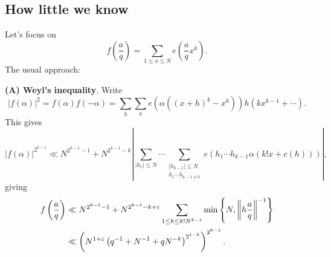 \documentclass[reqno]{amsart} 
\numberwithin{theorem}{section}
\numberwithin{equation}{section}
\begin{document}
\subsection{How little we know}

Let's focus on
\begin{equation*}
  f\left(\frac{a}{q}\right) = \sum_{1 \leq x \leq N}
  e \left( \frac{a}{q} x^k \right).
\end{equation*}
The usual approach:

\textbf{(A) Weyl's inequality}.  Write
\begin{equation*}
  \lvert f(\alpha) \rvert^2 = f(\alpha) f(- \alpha)
  = \sum_h \sum_x e \left( \alpha \left((x + h)^k - x^k \right) \right)
  h(k x^{k - 1} + \dotsb).
\end{equation*}
This gives
\begin{equation*}
  \lvert f(\alpha) \rvert^{2^{k - 1}}
  \ll N^{2^{k - 1} - 1} + N^{2^{k - 1} - k}
  \left\lvert
    \sum_{\lvert h_1 \rvert \leq N} \dotsb \sum_{
      \substack{
        \left\lvert h_{k-1}\right\rvert \leq N   \\
        h_1 \dotsb h_{k - 1 \neq 0}
      }
    }
    e \left( h_1 \dotsb h_{k - 1} \alpha(k ! x + c(h)) \right)
  \right\rvert,
\end{equation*}
giving
\begin{align*}
  f\left(\frac{a}{q}\right)
  &\ll N^{2^{k - 1} - 1} + N^{2^{k - 1} - k + \varepsilon}
  \sum_{1 \leq h \leq k ! N^{k - 1}} \min \left\{ N, \left\lVert h \frac{a}{q} \right\rVert^{-1} \right\} \\
  &\ll \left(N^{1 + \varepsilon}
    \left( q^{-1} + N^{-1} + q N^{- k} \right)^{2^{1 - k}} \right)^{2^{k - 1}}.
\end{align*}
\end{document}
